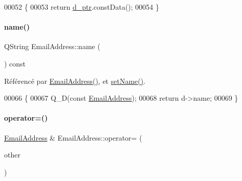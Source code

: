 \begin{DoxyCode}
00052     \{
00053         \textcolor{keywordflow}{return} \hyperlink{class_simple_mail_1_1_email_address_a27188c75c77a942e79cac0420788f214}{d\_ptr}.constData();
00054     \}
\end{DoxyCode}
\mbox{\label{class_simple_mail_1_1_email_address_a311fdcf9bc548a3db4a985b396ab5355}} 
\paragraph{\texorpdfstring{name()}{name()}}
{\footnotesize\ttfamily Q\+String Email\+Address\+::name (\begin{DoxyParamCaption}{ }\end{DoxyParamCaption}) const}



Référencé par \hyperlink{class_simple_mail_1_1_email_address_a8bfbbe6dbdc1f420a7e6c7e52468bd54}{Email\+Address()}, et \hyperlink{class_simple_mail_1_1_email_address_a09d30bfa2caf56202f78bbc5f7ed543e}{set\+Name()}.


\begin{DoxyCode}
00066 \{
00067     Q\_D(\textcolor{keyword}{const} \hyperlink{class_simple_mail_1_1_email_address}{EmailAddress});
00068     \textcolor{keywordflow}{return} d->name;
00069 \}
\end{DoxyCode}
\mbox{\label{class_simple_mail_1_1_email_address_a833afb6d4b354bddffa26fd71c70fc2e}} 
\paragraph{\texorpdfstring{operator=()}{operator=()}}
{\footnotesize\ttfamily \hyperlink{class_simple_mail_1_1_email_address}{Email\+Address} \& Email\+Address\+::operator= (\begin{DoxyParamCaption}\item[{const \hyperlink{class_simple_mail_1_1_email_address}{Email\+Address} \&}]{other }\end{DoxyParamCaption})}



